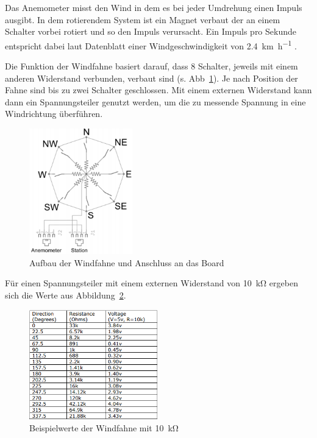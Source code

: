 Das Anemometer misst den Wind in dem es bei jeder Umdrehung einen Impuls ausgibt. In dem rotierendem System ist ein Magnet verbaut der an einem Schalter vorbei rotiert und so den Impuls verursacht. Ein Impuls pro Sekunde entspricht dabei laut Datenblatt einer Windgeschwindigkeit von \SI{2.4}{\km\per\hour} \cite{argent_data_systems}.

Die Funktion der Windfahne basiert darauf, dass 8 Schalter, jeweils mit einem anderen Widerstand verbunden, verbaut sind (s. Abb~\ref{fig:Wind_Plan}). Je nach Position der Fahne sind bis zu zwei Schalter geschlossen. Mit einem externen Widerstand kann dann ein Spannungsteiler genutzt werden, um die zu messende Spannung in eine Windrichtung überführen. 

\begin{figure}[H]
  \centering
  \includegraphics[width=0.4\textwidth]{./img/Wind_Plan.png}
  \caption{Aufbau der Windfahne und Anschluss an das Board \cite{argent_data_systems}}\label{fig:Wind_Plan}
\end{figure}

Für einen Spannungsteiler mit einem externen Widerstand von \SI{10}{\kilo\ohm} ergeben sich die Werte aus Abbildung~\ref{fig:Wind_Werte}.

\begin{figure}[H]
  \centering
  \includegraphics[width=0.5\textwidth]{./img/Wind_Werte.png}
  \caption{Beispielwerte der Windfahne mit \SI{10}{\kilo\ohm} \cite{argent_data_systems}}\label{fig:Wind_Werte}
\end{figure}

